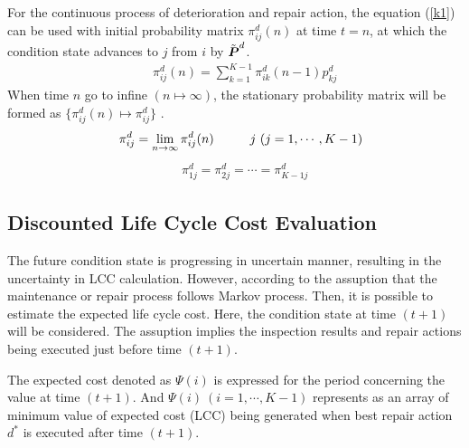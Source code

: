 For the continuous process of deterioration and repair action, the equation (\ref{k1}) can be used with initial probability matrix $\pi^d_{ij}(n)$ at time $t=n$, at which the condition state advances to $j$ from $i$ by $\tilde{\mbox{\boldmath$P$}}^d$.
\begin{eqnarray}
&& \pi_{ij}^d(n) = \sum_{k=1}^{K-1} \pi_{ik}^d(n-1)p_{kj}^{d}
\end{eqnarray}
When time $n$ go to infine $(n \mapsto \infty)$, the stationary probability matrix will be formed as $\lbrace\pi_{ij}^d(n) \mapsto \pi_{ij}^d\rbrace$ . 
\begin{eqnarray}
&& \pi_{ij}^d=\lim_{n \rightarrow \infty} \pi_{ij}^d(n)
\hspace{10mm} j~(j=1,\cdots,K-1) 
\end{eqnarray}
\begin{eqnarray}
&& \pi_{1j}^d=\pi_{2j}^d=\cdots=\pi_{K-1j}^d \label{ergod}
\end{eqnarray}
\subsection{Discounted Life Cycle Cost Evaluation}
\label{632}
The future condition state is progressing in uncertain manner, resulting in the uncertainty in LCC calculation. However, according to the assuption that the maintenance or repair process follows Markov process. Then, it is possible to estimate the expected life cycle cost. Here, the condition state at time $(t+1)$ will be considered. The assuption implies the inspection results and repair actions being executed just before time $(t+1)$. 

The expected cost denoted as $\Psi(i)$ is expressed for the period concerning the value at time $(t+1)$. And $\Psi(i)~(i=1,\cdots,K-1)$ represents as an array of minimum value of expected cost (LCC) being generated when best repair action $d^{\ast}$ is executed after time $(t+1)$.

